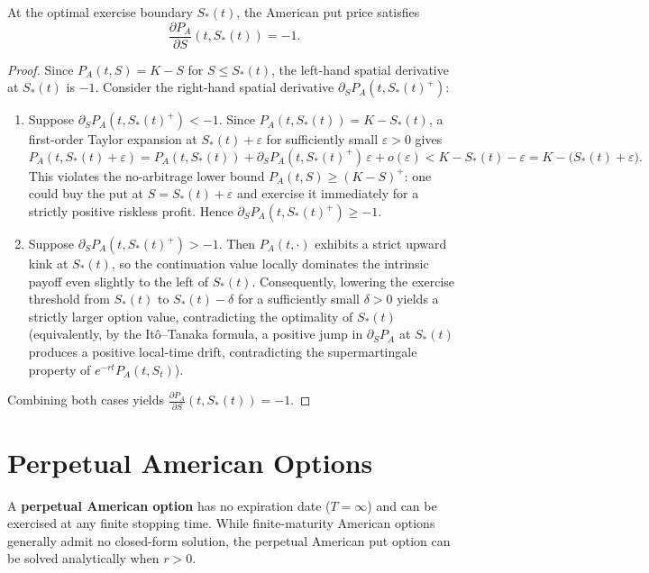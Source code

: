 \begin{proposition}\label{prop:smooth-pasting}
    At the optimal exercise boundary $S_*(t)$, the American put price satisfies
    \[
    \frac{\partial P_A}{\partial S}(t, S_*(t)) = -1.
    \]
\end{proposition}
\begin{proof}
    Since $P_A(t, S) = K - S$ for $S \le S_*(t)$, the left-hand spatial derivative at $S_*(t)$ is $-1$. Consider the right-hand spatial derivative $\partial_S P_A(t, S_*(t)^+)$:
    \begin{enumerate}
        \item Suppose $\partial_S P_A(t, S_*(t)^+) < -1$. Since $P_A(t, S_*(t)) = K - S_*(t)$, a first-order Taylor expansion at $S_*(t) + \varepsilon$ for sufficiently small $\varepsilon > 0$ gives
        \[
        P_A(t, S_*(t) + \varepsilon) = P_A(t, S_*(t)) + \partial_S P_A(t, S_*(t)^+)\,\varepsilon + o(\varepsilon) < K - S_*(t) - \varepsilon = K - \bigl(S_*(t) + \varepsilon\bigr).
        \]
        This violates the no-arbitrage lower bound $P_A(t, S) \ge (K - S)^+$: one could buy the put at $S = S_*(t) + \varepsilon$ and exercise it immediately for a strictly positive riskless profit. Hence $\partial_S P_A(t, S_*(t)^+) \ge -1$.
        \item Suppose $\partial_S P_A(t, S_*(t)^+) > -1$. Then $P_A(t, \cdot)$ exhibits a strict upward kink at $S_*(t)$, so the continuation value locally dominates the intrinsic payoff even slightly to the left of $S_*(t)$. Consequently, lowering the exercise threshold from $S_*(t)$ to $S_*(t) - \delta$ for a sufficiently small $\delta > 0$ yields a strictly larger option value, contradicting the optimality of $S_*(t)$ (equivalently, by the It\^{o}--Tanaka formula, a positive jump in $\partial_S P_A$ at $S_*(t)$ produces a positive local-time drift, contradicting the supermartingale property of $e^{-rt}P_A(t, S_t)$).
    \end{enumerate}
    Combining both cases yields $\frac{\partial P_A}{\partial S}(t, S_*(t)) = -1$.
\end{proof}

\section{Perpetual American Options}

A \textbf{perpetual American option} has no expiration date ($T = \infty$) and can be exercised at any finite stopping time. While finite-maturity American options generally admit no closed-form solution, the perpetual American put option can be solved analytically when $r > 0$.

